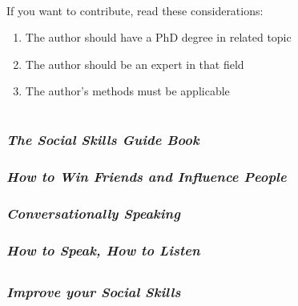 \documentclass[12pt, a4paper]{article}
\begin{document}
\newpage

\begin{large}
\paragraph{}
If you want to contribute, read these considerations:

\begin{enumerate}

\item The author should have a PhD degree in related topic
\item The author should be an expert in that field
\item The author's methods must be applicable

\end{enumerate}

\end{large}

\newpage

\section*{}
\subsubsection*{\emph{The Social Skills Guide Book}}
\subsubsection*{\emph{How to Win Friends and Influence People}}
\subsubsection*{\emph{Conversationally Speaking}}
\subsubsection*{\emph{How to Speak, How to Listen}\\}

\subsection*{}
\subsubsection*{\emph{Improve your Social Skills}\\}
\end{document}
